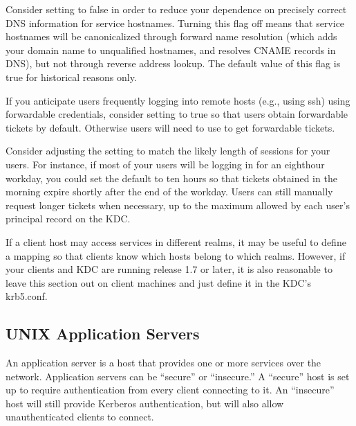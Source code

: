 \documentclass[letterpaper,10pt,english]{sphinxmanual}
\begin{document}
\sphinxAtStartPar
Consider setting  to false in order to reduce your dependence
on precisely correct DNS information for service hostnames.  Turning
this flag off means that service hostnames will be canonicalized
through forward name resolution (which adds your domain name to
unqualified hostnames, and resolves CNAME records in DNS), but not
through reverse address lookup.  The default value of this flag is
true for historical reasons only.

\sphinxAtStartPar
If you anticipate users frequently logging into remote hosts
(e.g., using ssh) using forwardable credentials, consider setting
 to true so that users obtain forwardable tickets by
default.  Otherwise users will need to use  to get
forwardable tickets.

\sphinxAtStartPar
Consider adjusting the  setting to match the likely
length of sessions for your users.  For instance, if most of your
users will be logging in for an eight\sphinxhyphen{}hour workday, you could set the
default to ten hours so that tickets obtained in the morning expire
shortly after the end of the workday.  Users can still manually
request longer tickets when necessary, up to the maximum allowed by
each user’s principal record on the KDC.

\sphinxAtStartPar
If a client host may access services in different realms, it may be
useful to define a {\hyperref[\detokenize{admin/conf_files/krb5_conf:domain-realm}]{}} mapping so that clients know
which hosts belong to which realms.  However, if your clients and KDC
are running release 1.7 or later, it is also reasonable to leave this
section out on client machines and just define it in the KDC’s
krb5.conf.

\sphinxstepscope


\subsection{UNIX Application Servers}
\label{\detokenize{admin/install_appl_srv:unix-application-servers}}\label{\detokenize{admin/install_appl_srv::doc}}
\sphinxAtStartPar
An application server is a host that provides one or more services
over the network.  Application servers can be “secure” or “insecure.”
A “secure” host is set up to require authentication from every client
connecting to it.  An “insecure” host will still provide Kerberos
authentication, but will also allow unauthenticated clients to
connect.
\end{document}

